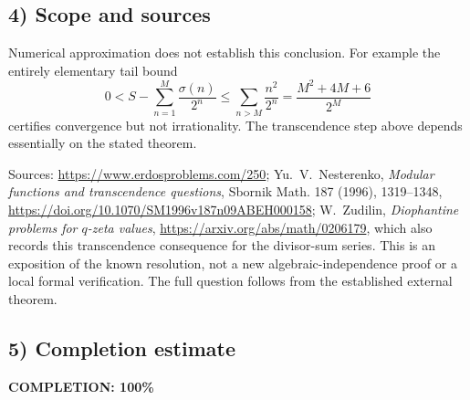 \subsection{4) Scope and sources}
Numerical approximation does not establish this conclusion.
For example the entirely elementary tail bound
\[
 0<S-\sum_{n=1}^M\frac{\sigma(n)}{2^n}
 \leq\sum_{n>M}\frac{n^2}{2^n}
 =\frac{M^2+4M+6}{2^M}
\]
certifies convergence but not irrationality. The transcendence
step above depends essentially on the stated theorem.

Sources: \url{https://www.erdosproblems.com/250};
Yu.~V.~Nesterenko, \emph{Modular functions and transcendence
questions}, Sbornik Math. 187 (1996), 1319--1348,
\url{https://doi.org/10.1070/SM1996v187n09ABEH000158};
W.~Zudilin, \emph{Diophantine problems for $q$-zeta values},
\url{https://arxiv.org/abs/math/0206179}, which also records this
transcendence consequence for the divisor-sum series.
This is an exposition of the known resolution, not a new
algebraic-independence proof or a local formal verification.
The full question follows from the established external theorem.
\subsection{5) Completion estimate}
\textbf{COMPLETION: 100\%}
